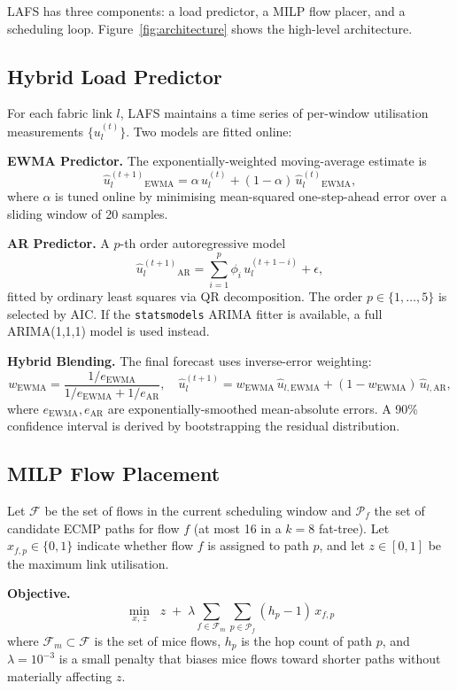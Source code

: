 \documentclass[runningheads]{llncs}
\begin{document}
LAFS has three components: a load predictor, a MILP flow placer, and a scheduling loop. Figure~\ref{fig:architecture} shows the high-level architecture.

\subsection{Hybrid Load Predictor}

For each fabric link $l$, LAFS maintains a time series of per-window utilisation measurements $\{u_l^{(t)}\}$. Two models are fitted online:

\medskip
\noindent\textbf{EWMA Predictor.} The exponentially-weighted moving-average estimate is
\[
  \hat{u}_l^{(t+1)}_{\text{EWMA}} = \alpha\, u_l^{(t)} + (1-\alpha)\, \hat{u}_l^{(t)}_{\text{EWMA}},
\]
where $\alpha$ is tuned online by minimising mean-squared one-step-ahead error over a sliding window of 20 samples.

\medskip
\noindent\textbf{AR Predictor.} A $p$-th order autoregressive model
\[
  \hat{u}_l^{(t+1)}_{\text{AR}} = \sum_{i=1}^{p} \phi_i\, u_l^{(t+1-i)} + \epsilon,
\]
fitted by ordinary least squares via QR decomposition. The order $p \in \{1,\ldots,5\}$ is selected by AIC. If the \texttt{statsmodels} ARIMA fitter is available, a full ARIMA(1,1,1) model is used instead.

\medskip
\noindent\textbf{Hybrid Blending.} The final forecast uses inverse-error weighting:
\[
  w_{\text{EWMA}} = \frac{1/e_{\text{EWMA}}}{1/e_{\text{EWMA}} + 1/e_{\text{AR}}}, \quad
  \hat{u}_l^{(t+1)} = w_{\text{EWMA}}\,\hat{u}_{l,\text{EWMA}} + (1-w_{\text{EWMA}})\,\hat{u}_{l,\text{AR}},
\]
where $e_{\text{EWMA}}, e_{\text{AR}}$ are exponentially-smoothed mean-absolute errors. A 90\% confidence interval is derived by bootstrapping the residual distribution.

\subsection{MILP Flow Placement}

Let $\mathcal{F}$ be the set of flows in the current scheduling window and $\mathcal{P}_f$ the set of candidate ECMP paths for flow $f$ (at most 16 in a $k{=}8$ fat-tree). Let $x_{f,p} \in \{0,1\}$ indicate whether flow $f$ is assigned to path $p$, and let $z \in [0,1]$ be the maximum link utilisation.

\medskip
\noindent\textbf{Objective.}
\begin{equation}
  \min_{x,\,z}\;\; z \;+\; \lambda \sum_{f \in \mathcal{F}_m} \sum_{p \in \mathcal{P}_f} (h_p - 1)\,x_{f,p}
  \label{eq:milp-obj}
\end{equation}
where $\mathcal{F}_m \subset \mathcal{F}$ is the set of mice flows, $h_p$ is the hop count of path $p$, and $\lambda = 10^{-3}$ is a small penalty that biases mice flows toward shorter paths without materially affecting $z$.
\end{document}
